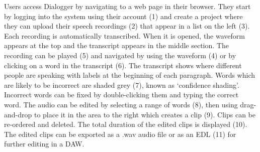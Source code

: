 Users access Dialogger by navigating to a web page in their browser. They start by logging into the system using their
account (1) and create a project where they can upload their speech recordings (2) that appear in a list on the left
(3). Each recording is automatically transcribed. When it is opened, the waveform appears at the top and the transcript
appears in the middle section.  The recording can be played (5) and navigated by using the waveform (4) or by clicking
on a word in the transcript (6). The transcript shows where different people are speaking with labels at the beginning
of each paragraph. Words which are likely to be incorrect are shaded grey (7), known as `confidence shading'.
Incorrect words can be fixed by double-clicking them and typing the correct word. The audio can be edited by selecting
a range of words (8), then using drag-and-drop to place it in the area to the right which creates a clip (9).  Clips
can be re-ordered and deleted. The total duration of the edited clips is displayed (10). The edited clips can be
exported as a .wav audio file or as an EDL (11) for further editing in a DAW.





